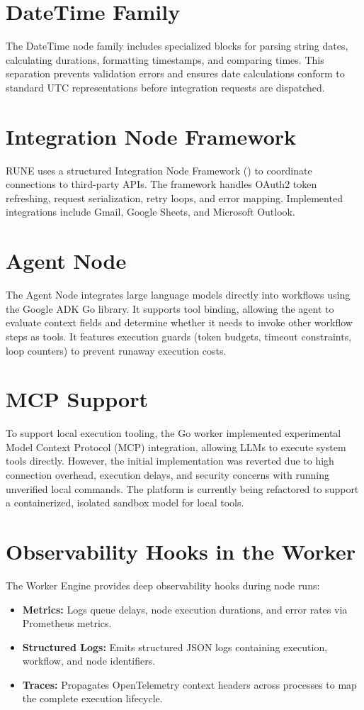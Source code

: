 \documentclass[12pt]{report}
\begin{document}
\section{DateTime Family}
The DateTime node family includes specialized blocks for parsing string dates, calculating durations, formatting timestamps, and comparing times. This separation prevents validation errors and ensures date calculations conform to standard UTC representations before integration requests are dispatched.

\section{Integration Node Framework}
RUNE uses a structured Integration Node Framework () to coordinate connections to third-party APIs. The framework handles OAuth2 token refreshing, request serialization, retry loops, and error mapping. Implemented integrations include Gmail, Google Sheets, and Microsoft Outlook.

\section{Agent Node}
The Agent Node integrates large language models directly into workflows using the Google ADK Go library. It supports tool binding, allowing the agent to evaluate context fields and determine whether it needs to invoke other workflow steps as tools. It features execution guards (token budgets, timeout constraints, loop counters) to prevent runaway execution costs.

\section{MCP Support}
To support local execution tooling, the Go worker implemented experimental Model Context Protocol (MCP) integration, allowing LLMs to execute system tools directly. However, the initial implementation was reverted due to high connection overhead, execution delays, and security concerns with running unverified local commands. The platform is currently being refactored to support a containerized, isolated sandbox model for local tools.

\section{Observability Hooks in the Worker}
The Worker Engine provides deep observability hooks during node runs:
\begin{itemize}
    \item \textbf{Metrics:} Logs queue delays, node execution durations, and error rates via Prometheus metrics.
    \item \textbf{Structured Logs:} Emits structured JSON logs containing execution, workflow, and node identifiers.
    \item \textbf{Traces:} Propagates OpenTelemetry context headers across processes to map the complete execution lifecycle.
\end{itemize}
\end{document}
